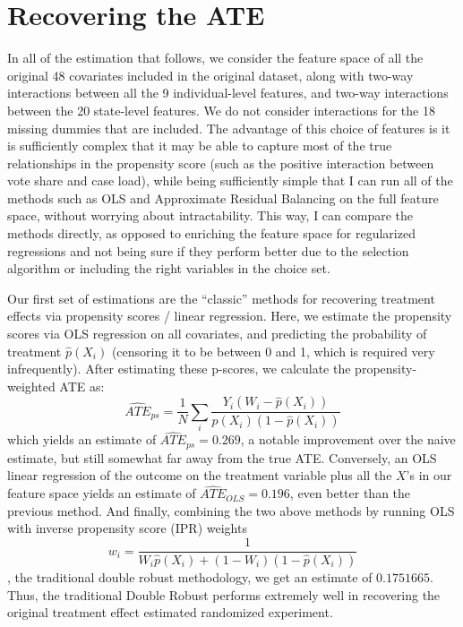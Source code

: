 \documentclass{article}
\begin{document}
\section{Recovering the ATE}
In all of the estimation that follows, we consider the feature space of all the original 48 covariates included in the original dataset, along with two-way interactions between all the 9 individual-level features, and two-way interactions between the 20 state-level features. We do not consider interactions for the 18 missing dummies that are included. The advantage of this choice of features is it is sufficiently complex that it may be able to capture most of the true relationships in the propensity score (such as the positive interaction between vote share and case load), while being sufficiently simple that I can run all of the  methods such as OLS and Approximate Residual Balancing on the full feature space, without worrying about intractability. This way, I can compare the methods directly, as opposed to enriching the feature space for regularized regressions and not being sure if they perform better due to the selection algorithm or including the right variables in the choice set.

Our first set of estimations are the ``classic'' methods for recovering treatment effects via propensity scores / linear regression. Here, we estimate the propensity scores via OLS regression on all covariates, and predicting the probability of treatment $\hat p(X_i)$ (censoring it to be between 0 and 1, which is required very infrequently). After estimating these p-scores, we calculate the propensity-weighted ATE as: 
\[\widehat{ATE}_{ps} = \frac{1}{N}\sum_i \frac{ Y_i(W_i-\hat p(X_i))}{\hat p(X_i)(1-\hat p(X_i)) }\]
which yields an estimate of $\widehat{ATE}_{ps}=0.269$, a notable improvement over the naive estimate, but still somewhat far away from the true ATE. Conversely, an OLS linear regression of the outcome on the treatment variable plus all the $X$'s in our feature  space yields an estimate of $\widehat{ATE}_{OLS}=0.196$, even better than the previous method. And finally, combining the two above methods  by running OLS with inverse propensity score (IPR) weights \[w_i = \frac{1}{W_i\hat p(X_i) + (1-W_i)(1-\hat p(X_i))}\], the traditional double robust methodology, we get an estimate of $0.1751665$. Thus, the traditional Double Robust  performs extremely well in recovering the original treatment effect estimated randomized experiment.
\end{document}
